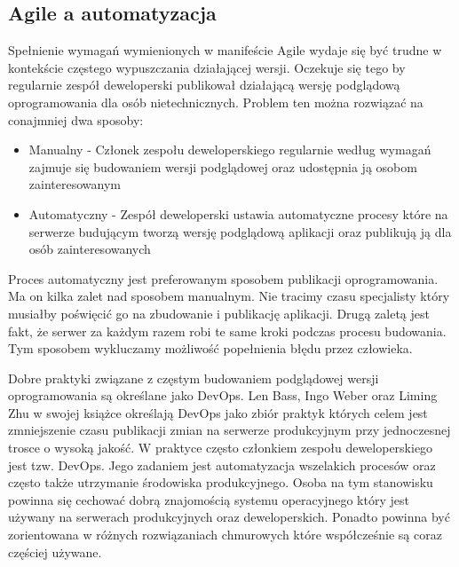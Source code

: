 \subsection{Agile a automatyzacja}
Spełnienie wymagań wymienionych w manifeście Agile wydaje się być trudne w kontekście częstego wypuszczania działającej wersji. Oczekuje się tego by regularnie zespół deweloperski publikował działającą wersję podglądową oprogramowania dla osób nietechnicznych. Problem ten można rozwiązać na conajmniej dwa sposoby:
\begin{itemize}
    \item Manualny - Członek zespołu deweloperskiego regularnie według wymagań zajmuje się budowaniem wersji podglądowej oraz udostępnia ją osobom zainteresowanym
    \item Automatyczny - Zespół deweloperski ustawia automatyczne procesy które na serwerze budującym tworzą wersję podglądową aplikacji oraz publikują ją dla osób zainteresowanych
\end{itemize}
Proces automatyczny jest preferowanym sposobem publikacji oprogramowania. Ma on kilka zalet nad sposobem manualnym. Nie tracimy czasu specjalisty który musiałby poświęcić go na zbudowanie i publikację aplikacji. Drugą zaletą jest fakt, że serwer za każdym razem robi te same kroki podczas procesu budowania. Tym sposobem wykluczamy możliwość popełnienia błędu przez człowieka.
\par
Dobre praktyki związane z częstym budowaniem podglądowej wersji oprogramowania są określane jako DevOps. Len Bass, Ingo Weber oraz Liming Zhu w swojej książce \cite{DevOpsBook} określają DevOps jako zbiór praktyk których celem jest zmniejszenie czasu publikacji zmian na serwerze produkcyjnym przy jednoczesnej trosce o wysoką jakość. W praktyce często członkiem zespołu deweloperskiego jest tzw. DevOps. Jego zadaniem jest automatyzacja wszelakich procesów oraz często także utrzymanie środowiska produkcyjnego. Osoba na tym stanowisku powinna się cechować dobrą znajomością systemu operacyjnego który jest używany na serwerach produkcyjnych oraz deweloperskich. Ponadto powinna być zorientowana w różnych rozwiązaniach chmurowych które współcześnie są coraz częściej używane.
